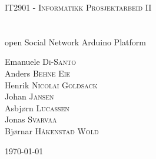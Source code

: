 \begin{titlepage} %


\begin{center}
\textsc{\Large IT2901 - Informatikk Prosjektarbeid II}{\Large \\[0.5cm]
\HRule \\[0.6cm] { }}\textbf{\huge \project}{\huge \\[0.4cm]
open Social Network Arduino Platform \HRule \\[1.5cm] } 
\par\end{center}



\begin{center}
{\large Emanuele }\textsc{\large Di-Santo}{\large {} }\\
 {\large {} Anders }\textsc{\large Behne Eie}{\large {} }\\
 {\large {} Henrik }\textsc{\large Nicolai Goldsack}{\large {} }\\
 {\large {} Johan }\textsc{\large Jansen}{\large {} }\\
 {\large {} Asbjørn }\textsc{\large Lucassen}{\large {} }\\
 {\large {} Jonas }\textsc{\large Svarvaa}{\large {} }\\
 {\large {} Bjørnar }\textsc{\large Håkenstad Wold}{\large {} } 
\par\end{center}



{\large \vfill{}
 \today }{\large \par}

\end{titlepage} 
